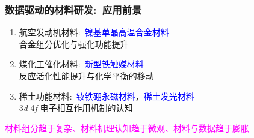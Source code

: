 \begin{frame}
	\frametitle{数据驱动的材料研发:~应用前景}
	\begin{enumerate}
	 \setlength{\itemsep}{20pt}
	 \item 航空发动机材料:~\textcolor{blue}{镍基单晶高温合金材料}\\
	合金组分优化与强化功能提升

\item 煤化工催化材料:~\textcolor{blue}{新型铁触媒材料}\\
	反应活化性能提升与化学平衡的移动

		\item 稀土功能材料:~\textcolor{blue}{钕铁硼永磁材料}，\textcolor{blue}{稀土发光材料}\\
	3\textit{d}-4\textit{f} 电子相互作用机制的认知

	\end{enumerate}

	\textcolor{magenta}{材料组分趋于复杂、材料机理认知趋于微观、材料与数据趋于膨胀}
\end{frame}
